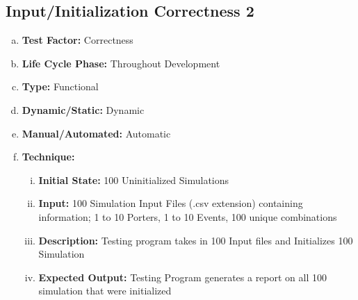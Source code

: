 \documentclass[paper=letter, fontsize=10pt]{scrartcl}
\numberwithin{equation}{section}		%
\numberwithin{figure}{section}			%
\numberwithin{table}{section}				%
\begin{document}
\subsection{Input/Initialization Correctness 2}
\begin{enumerate}[(a)]
	\item \textbf{Test Factor:} Correctness  
	\item \textbf{Life Cycle Phase:} Throughout Development
	\item \textbf{Type:} Functional
	\item \textbf{Dynamic/Static:} Dynamic
	\item \textbf{Manual/Automated:} Automatic
	\item \textbf{Technique:}
		\begin{enumerate}[(i)]
			\item \textbf{Initial State:} 100 Uninitialized Simulations   
			\item \textbf{Input:} 100 Simulation Input Files (.csv extension) containing information; 1 to 10 Porters,  1 to 10 Events, 100 unique combinations
			\item \textbf{Description:} Testing program takes in 100 Input files and Initializes 100 Simulation
			\item \textbf{Expected Output:} Testing Program generates a report on all 100 simulation that were initialized 
		\end{enumerate}
\end{enumerate}
\end{document}
